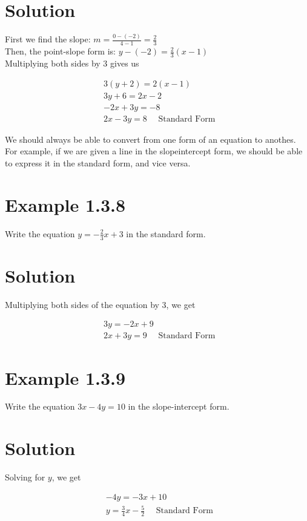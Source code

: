\section*{Solution}
First we find the slope: $m=\frac{0-(-2)}{4-1}=\frac{2}{3}$\\
Then, the point-slope form is: $y-(-2)=\frac{2}{3}(x-1)$\\
Multiplying both sides by 3 gives us

$$
\begin{aligned}
& 3(y+2)=2(x-1) \\
& 3 y+6=2 x-2 \\
& -2 x+3 y=-8 \\
& 2 x-3 y=8 \quad \text { Standard Form }
\end{aligned}
$$

We should always be able to convert from one form of an equation to anothes. For example, if we are given a line in the slopeintercept form, we should be able to express it in the standard form, and vice versa.

\section*{Example 1.3.8}
Write the equation $y=-\frac{2}{3} x+3$ in the standard form.

\section*{Solution}
Multiplying both sides of the equation by 3, we get

$$
\begin{aligned}
& 3 y=-2 x+9 \\
& 2 x+3 y=9 \quad \text { Standard Form }
\end{aligned}
$$

\section*{Example 1.3.9}
Write the equation $3 x-4 y=10$ in the slope-intercept form.

\section*{Solution}
Solving for $y$, we get

$$
\begin{aligned}
& -4 y=-3 x+10 \\
& y=\frac{3}{4} x-\frac{5}{2} \quad \text { Standard Form }
\end{aligned}
$$

